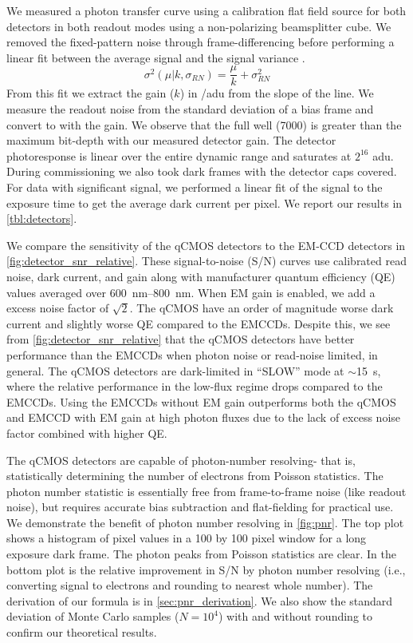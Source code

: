 We measured a photon transfer curve using a calibration flat field source for both detectors in both readout modes using a non-polarizing beamsplitter cube. We removed the fixed-pattern noise through frame-differencing before performing a linear fit between the average signal and the signal variance \citep{stefanov_cmos_2022}. 
\begin{equation}
    \sigma^2\left(\mu | k, \sigma_{RN}\right) = \frac{\mu}{k} + \sigma^2_{RN}
\end{equation}
From this fit we extract the gain ($k$) in \si{\electron/adu} from the slope of the line. We measure the readout noise from the standard deviation of a bias frame and convert to \si{\electron} with the gain. We observe that the full well (\SI{7000}{\electron}) is greater than the maximum bit-depth with our measured detector gain. The detector photoresponse is linear over the entire dynamic range and saturates at $2^{16}$ \si{adu}. During commissioning we also took dark frames with the detector caps covered. For data with significant signal, we performed a linear fit of the signal to the exposure time to get the average dark current per pixel. We report our results in \autoref{tbl:detectors}.

We compare the sensitivity of the qCMOS detectors to the EM-CCD detectors in \autoref{fig:detector_snr_relative}. These signal-to-noise (S/N) curves use calibrated read noise, dark current, and gain along with manufacturer quantum efficiency (QE) values averaged over \SIrange{600}{800}{nm}. When EM gain is enabled, we add a excess noise factor of $\sqrt{2}$. The qCMOS have an order of magnitude worse dark current and slightly worse QE compared to the EMCCDs. Despite this, we see from \autoref{fig:detector_snr_relative} that the qCMOS detectors have better performance than the EMCCDs when photon noise or read-noise limited, in general. The qCMOS detectors are dark-limited in ``SLOW'' mode at $\sim$\SI{15}{s}, where the relative performance in the low-flux regime drops compared to the EMCCDs. Using the EMCCDs without EM gain outperforms both the qCMOS and EMCCD with EM gain at high photon fluxes due to the lack of excess noise factor combined with higher QE.

The qCMOS detectors are capable of photon-number resolving- that is, statistically determining the number of electrons from Poisson statistics. The photon number statistic is essentially free from frame-to-frame noise (like readout noise), but requires accurate bias subtraction and flat-fielding for practical use. We demonstrate the benefit of photon number resolving in \autoref{fig:pnr}. The top plot shows a histogram of pixel values in a 100 by 100 pixel window for a long exposure dark frame. The photon peaks from Poisson statistics are clear. In the bottom plot is the relative improvement in S/N by photon number resolving (i.e., converting signal to electrons and rounding to nearest whole number). The derivation of our formula is in \autoref{sec:pnr_derivation}. We also show the standard deviation of Monte Carlo samples ($N=10^4$) with and without rounding to confirm our theoretical results.

